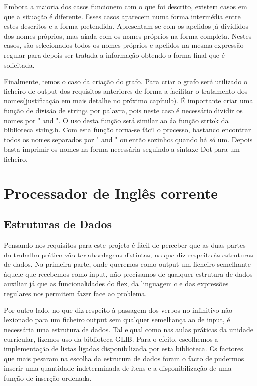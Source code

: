 \documentclass{report}
\begin{document}
Embora a maioria dos casos funcionem com o que foi descrito, existem casos em que a situação
é diferente. Esses casos aparecem numa forma intermédia entre estes descritos e a forma
pretendida. Apresentam-se com os apelidos já divididos dos nomes próprios, mas ainda com os 
nomes próprios na forma completa. 
Nestes casos, são selecionados todos os nomes próprios e apelidos na mesma expressão regular 
para depois ser tratada a informação obtendo a forma final que é solicitada.\par

Finalmente, temos o caso da criação do grafo. Para criar o grafo será utilizado o ficheiro de output
dos requisitos anteriores de forma a facilitar o tratamento dos nomes(justificação em mais detalhe 
no próximo capítulo). É importante criar uma função de divisão de strings por palavra, pois neste caso é 
necessário dividir os nomes por " and ". O uso desta função será similar ao da função strtok da 
biblioteca string.h. 
Com esta função torna-se fácil o processo, bastando encontrar todos os nomes separados por " and " 
ou então sozinhos quando há só um. 
Depois basta imprimir os nomes na forma necessária seguindo a sintaxe Dot para um ficheiro.

\section{Processador de Inglês corrente}
\subsection{Estruturas de Dados}
Pensando nos requisitos para este projeto é fácil de perceber que as duas partes do 
trabalho prático vão ter abordagens distintas, no que diz respeito às estruturas 
de dados. Na primeira parte, onde queremos como output um ficheiro semelhante 
àquele que recebemos como input, não precisamos de qualquer estrutura de dados 
auxiliar já que as funcionalidades do flex, da linguagem c e das expressões 
regulares nos permitem fazer face ao problema.

Por outro lado, no que diz respeito à passagem dos verbos no infinitivo não 
lexionado para um ficheiro output sem qualquer semelhança ao de input, 
é necessária uma estrutura de dados. Tal e qual como nas aulas práticas 
da unidade curricular, fizemos uso da biblioteca GLIB. Para o efeito, 
escolhemos a implementação de listas ligadas disponibilizada por esta biblioteca. 
Os factores que mais pesaram na escolha da estrutura de dados foram o facto de 
pudermos inserir uma quantidade indeterminada de itens e a disponibilização 
de uma função de inserção ordenada. 
\end{document}
